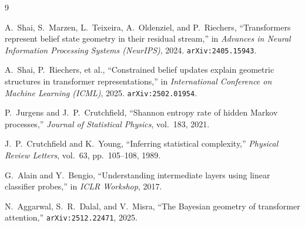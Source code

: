 \documentclass[11pt]{article}
\begin{document}
\begingroup
\renewcommand{\section}[2]{}
\begin{thebibliography}{9}

A.~Shai, S.~Marzen, L.~Teixeira, A.~Oldenziel, and P.~Riechers,
``Transformers represent belief state geometry in their residual stream,''
in \emph{Advances in Neural Information Processing Systems (NeurIPS)}, 2024.
\texttt{arXiv:2405.15943}.

A.~Shai, P.~Riechers, et al.,
``Constrained belief updates explain geometric structures in transformer representations,''
in \emph{International Conference on Machine Learning (ICML)}, 2025.
\texttt{arXiv:2502.01954}.

P.~Jurgens and J.~P.~Crutchfield,
``Shannon entropy rate of hidden Markov processes,''
\emph{Journal of Statistical Physics}, vol.~183, 2021.

J.~P.~Crutchfield and K.~Young,
``Inferring statistical complexity,''
\emph{Physical Review Letters}, vol.~63, pp.~105--108, 1989.

G.~Alain and Y.~Bengio,
``Understanding intermediate layers using linear classifier probes,''
in \emph{ICLR Workshop}, 2017.

N.~Aggarwal, S.~R.~Dalal, and V.~Misra,
``The Bayesian geometry of transformer attention,''
\texttt{arXiv:2512.22471}, 2025.

\end{thebibliography}
\endgroup
\end{document}
